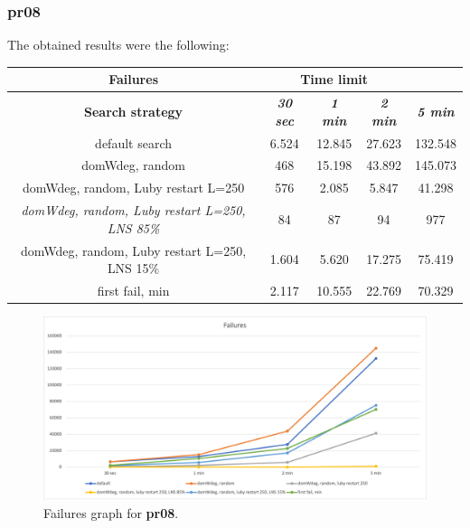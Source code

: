 \subsubsection{pr08}
\label{subsubsec:pr08}
The obtained results were the following:
{
\renewcommand{\arraystretch}{2}
\begin{longtable}[h]{| c | c | c | c | c |}
    \hline
    \textbf{Failures} & \multicolumn{3}{c}{\textbf{Time limit}} & \\
    \hline
    \textbf{Search strategy} & \textbf{\textit{30 sec}} & \textbf{\textit{1 min}} & \textbf{\textit{2 min}} & \textbf{\textit{5 min}} \\
    \hline
    \endhead
    default search                                         & 6.524 & 12.845 &  27.623 & 132.548 \\
    \hline
    domWdeg, random                                        &  468 & 15.198 &  43.892 & 145.073 \\
    \hline
    domWdeg, random, Luby restart L=250                    &  576 &  2.085 &   5.847 &  41.298 \\
    \hline
    \textit{domWdeg, random, Luby restart L=250, LNS 85\%} &   84 &    87 &     94 &    977 \\
    \hline
    domWdeg, random, Luby restart L=250, LNS 15\%          & 1.604 &  5.620 &  17.275 &  75.419 \\
    \hline
    first fail, min                                        & 2.117 & 10.555 &  22.769 &  70.329 \\
    \hline
\end{longtable}
}
\begin{figure}[H]
    \centering
    \includegraphics[width=0.8\columnwidth]{../graphs/pr08-failures.png}
    \caption{Failures graph for \textbf{pr08}.}
\end{figure}

